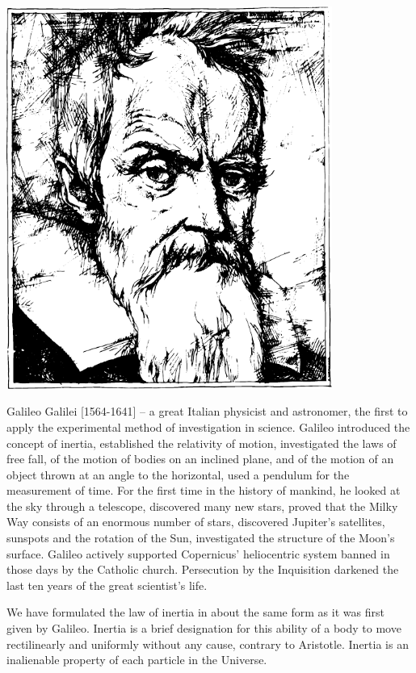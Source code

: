 \begin{center}
\includegraphics[width=0.8\textwidth]{figures/galileo.pdf}
\end{center}
{\small \textsf{{Galileo Galilei [1564-1641]}} -- \textsf{\footnotesize a great Italian physicist and astronomer, the first to apply the experimental method of investigation
in science. Galileo introduced the concept of inertia, established
the relativity of motion, investigated the laws of free fall, of the motion of bodies on an inclined plane, and of the motion of an
object thrown at an angle to the horizontal, used a pendulum for
the measurement of time. For the first time in the history of
mankind, he looked at the sky through a telescope, discovered
many new stars, proved that the Milky Way consists of an enormous number of stars, discovered Jupiter's satellites, sunspots and
the rotation of the Sun, investigated the structure of the Moon's
surface. Galileo actively supported Copernicus' heliocentric system banned in those days by the Catholic church. Persecution by the Inquisition darkened the last ten years of the great scientist's
life.}}



We have formulated the law of inertia in about the
same form as it was first given by Galileo. Inertia is
a brief designation for this ability of a body to move rectilinearly and uniformly without any cause, contrary to Aristotle. Inertia is an inalienable property of each particle in the Universe.

